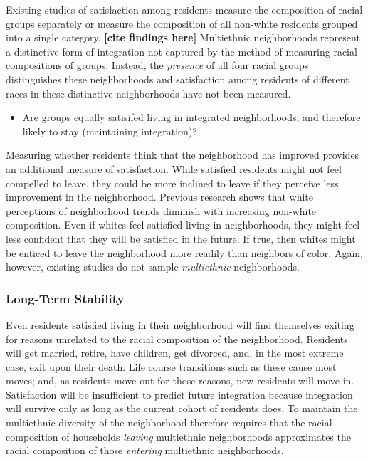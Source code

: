 \documentclass{baderart}
\providecommand{\tightlist}{%
  \setlength{\itemsep}{0pt}\setlength{\parskip}{0pt}}
\begin{document}
Existing studies of satisfaction among residents measure the composition of racial groups separately or measure the composition of all non-white residents grouped into a single category. \textbf{{[}cite findings here{]}} Multiethnic neighborhoods represent a distinctive form of integration not captured by the method of measuring racial compositions of groups. Instead, the \emph{presence} of all four racial groups distinguishes these neighborhoods and satisfaction among residents of different races in these distinctive neighborhoods have not been measured.

\begin{itemize} \tightlist \item   Are groups equally satisifed living in integrated neighborhoods, and   therefore likely to stay (maintaining integration)? \end{itemize}

Measuring whether residents think that the neighborhood has improved provides an additional measure of satisfaction. While satisfied residents might not feel compelled to leave, they could be more inclined to leave if they perceive less improvement in the neighborhood. Previous research shows that white perceptions of neighborhood trends diminish with increasing non-white composition. Even if whites feel satisfied living in neighborhoods, they might feel less confident that they will be satisfied in the future. If true, then whites might be enticed to leave the neighborhood more readily than neighbors of color. Again, however, existing studies do not sample \emph{multiethnic} neighborhoods.


\subsubsection{Long-Term Stability}\label{long-term-stability}

Even residents satisfied living in their neighborhood will find themselves exiting for reasons unrelated to the racial composition of the neighborhood. Residents will get married, retire, have children, get divorced, and, in the most extreme case, exit upon their death. Life course transitions such as these cause most moves; and, as residents move out for those reasons, new residents will move in. Satisfaction will be insufficient to predict future integration because integration will survive only as long as the current cohort of residents does. To maintain the multiethnic diversity of the neighborhood therefore requires that the racial composition of households \emph{leaving} multiethnic neighborhoods approximates the racial composition of those \emph{entering} multiethnic neighborhoods.
\end{document}
